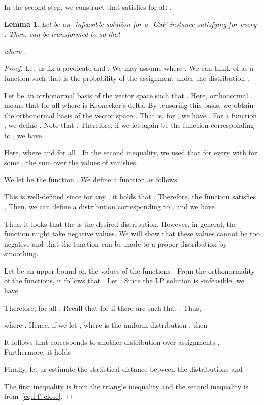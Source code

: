 \documentclass[letterpaper, 11pt]{article}
\newtheorem{lemma}[theorem]{Lemma}
\begin{document}
In the second step,
we construct  that satisfies  for all .
\begin{lemma}\label{lmm:smoothing}
  Let  be an -infeasible solution for a -CSP instance  satisfying  for every .
  Then,  can be transformed to  so that
  
  where .
\end{lemma}
\begin{proof}
  Let us fix a predicate  and .
  We may assume  where .
  We can think of  as a function  such that  is the probability of the assignment  under the distribution .

  Let  be an orthonormal basis of the vector space  such that .
  Here, orthonormal means that  for all  where  is Kronecker's delta.
  By tensoring this basis, 
  we obtain the orthonormal basis  of the vector space .
  That is,
  for ,
  we have .
  For a function ,
  we define .
  Note that .
  Therefore, 
  if we let  again be the function corresponding to , 
  we have
  
  Here,  where  and  for all .
  In the second inequality, we used that for every  with  for some ,
  the sum over the values of  vanishes.

  We let  be the function .
  We define a function  as follows.
  
  This is well-defined since for any , 
  it holds that .
  Therefore, the function  satisfies ,
  Then, we can define a distribution  corresponding to ,
  and we have
  
  Thus, it looks that the  is the desired distribution.
  However, in general, 
  the function  might take negative values.
  We will show that these values cannot be too negative and that the function can be made to a proper distribution by smoothing.
  
  Let  be an upper bound on the values of the functions .
  From the orthonormality of the functions, 
  it follows that .
  Let .
  Since the LP solution  is -infeasible,
  we have
  
  Therefore,  for all .
  Recall that  for  if there are  such that .
  Thus,
  
  where .
  Hence, if we let ,
  where  is the uniform distribution ,
  then
  
  It follows that  corresponds to another distribution  over assignments .
  Furthermore, it holds 
  
  Finally, let us estimate the statistical distance between the distributions  and .
  
  The first inequality is from the triangle inequality and the second inequality is from~\eqref{eq:f-f'-close}.
\end{proof}
\end{document}
